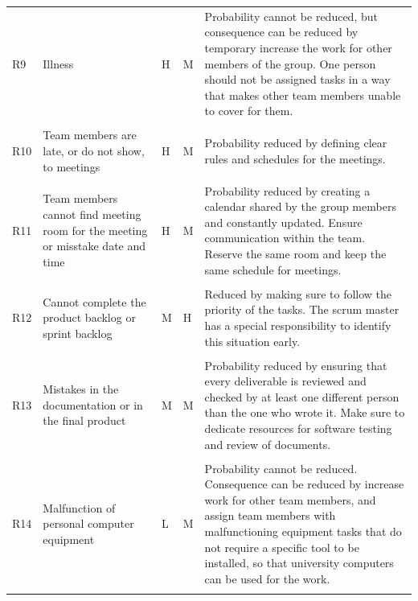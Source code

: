 \documentclass[11pt,a4paper,titlepage,oneside]{report}
\begin{document}
\begin{longtable}{p{0.7cm} p{2.5cm} p{0.7cm} p{0.7cm} p{6.5cm} }
R9 & Illness & \gls{H} & \gls{M} & Probability cannot be reduced, but consequence can be reduced by temporary increase the work for other members of the group. One person should not be assigned tasks in a way that makes other team members unable to cover for them. \\ \\ \hline
R10 & Team members are late, or do not show, to meetings & \gls{H} & \gls{M} & Probability reduced by defining clear rules and schedules for the meetings. \\ \\ \hline
R11 & Team members cannot find meeting room for the meeting or misstake date and time & \gls{H} & \gls{M} & Probability reduced by creating a calendar shared by the group members and constantly updated. Ensure communication within the team. Reserve the same room and keep the same schedule for meetings. \\ \\ \hline
R12 & Cannot complete the product backlog or sprint backlog & \gls{M} & \gls{H} & Reduced by making sure to follow the priority of the tasks. The scrum master has a special responsibility to identify this situation early. \\ \\ \hline
R13 & Mistakes in the documentation or in the final product & \gls{M} & \gls{M} & Probability reduced by ensuring that every deliverable is reviewed and checked by at least one different person than the one who wrote it. Make sure to dedicate resources for software testing and review of documents. \\ \\ \hline
R14 & Malfunction of personal computer equipment & \gls{L} & \gls{M} & Probability cannot be reduced. Consequence can be reduced by increase work for other team members, and assign team members with malfunctioning equipment tasks that do not require a specific tool to be installed, so that university computers can be used for the work. \\ \\ \hline
\end{longtable}
\end{document}
